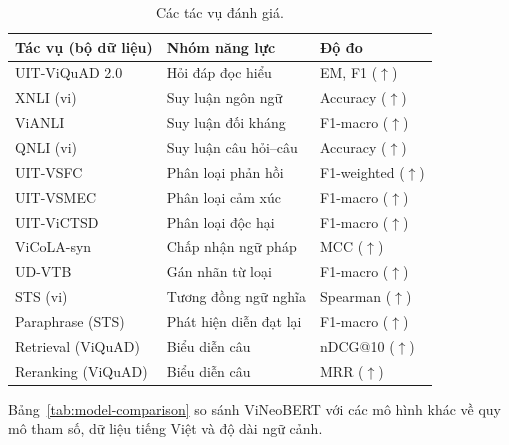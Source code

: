 \begin{table}[ht]
  \caption{Các tác vụ đánh giá.}
  \label{tab:eval-tasks}
  \centering
  \small
  \begin{tabular}{lll}
    \hline
    \textbf{Tác vụ (bộ dữ liệu)} & \textbf{Nhóm năng lực} & \textbf{Độ đo} \\
    \hline
    UIT-ViQuAD 2.0     & Hỏi đáp đọc hiểu        & EM, F1 ($\uparrow$) \\
    XNLI (vi)          & Suy luận ngôn ngữ       & Accuracy ($\uparrow$) \\
    ViANLI             & Suy luận đối kháng      & F1-macro ($\uparrow$) \\
    QNLI (vi)          & Suy luận câu hỏi--câu   & Accuracy ($\uparrow$) \\
    UIT-VSFC           & Phân loại phản hồi      & F1-weighted ($\uparrow$) \\
    UIT-VSMEC          & Phân loại cảm xúc       & F1-macro ($\uparrow$) \\
    UIT-ViCTSD         & Phân loại độc hại       & F1-macro ($\uparrow$) \\
    ViCoLA-syn         & Chấp nhận ngữ pháp      & MCC ($\uparrow$) \\
    UD-VTB             & Gán nhãn từ loại        & F1-macro ($\uparrow$) \\
    STS (vi)           & Tương đồng ngữ nghĩa    & Spearman ($\uparrow$) \\
    Paraphrase (STS)   & Phát hiện diễn đạt lại  & F1-macro ($\uparrow$) \\
    Retrieval (ViQuAD) & Biểu diễn câu           & nDCG@10 ($\uparrow$) \\
    Reranking (ViQuAD) & Biểu diễn câu           & MRR ($\uparrow$) \\
    \hline
  \end{tabular}
\end{table}

Bảng~\ref{tab:model-comparison} so sánh ViNeoBERT với các mô hình khác về quy mô tham số, dữ liệu tiếng Việt và độ dài ngữ cảnh.

